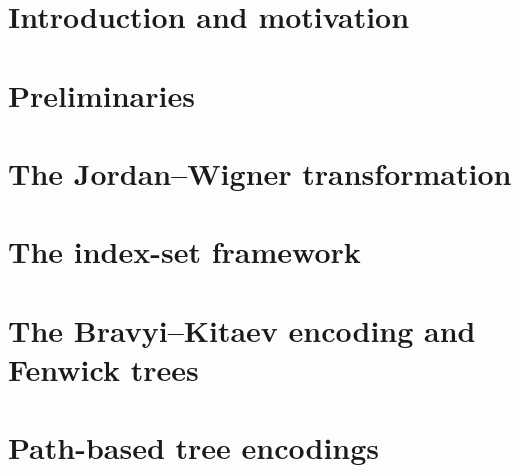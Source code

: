 \documentclass[aps,pra,preprint,superscriptaddress,showpacs]{revtex4-2}
\theoremstyle{definition}
\theoremstyle{remark}
\begin{document}
\section{Introduction and motivation}
\label{sec:intro}


\section{Preliminaries}
\label{sec:prelim}


\section{The Jordan--Wigner transformation}
\label{sec:jw}


\section{The index-set framework}
\label{sec:index-set}


\section{The Bravyi--Kitaev encoding and Fenwick trees}
\label{sec:bk}


\section{Path-based tree encodings}
\label{sec:tree-encoding}

\end{document}
